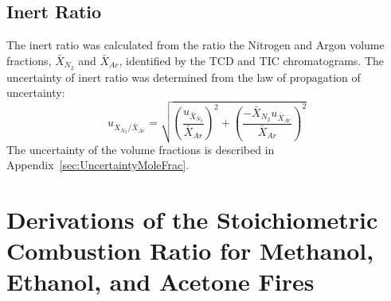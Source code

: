\documentclass[12pt]{article}
\begin{document}
\subsection{Inert Ratio}
\label{ssec:Inert_ratio}
The inert ratio was calculated from the ratio the Nitrogen and Argon volume fractions, $\bar{X}_{N_2}$ and $\bar{X}_{Ar}$, identified by the TCD and TIC chromatograms. The uncertainty of inert ratio was determined from the law of propagation of uncertainty:
\begin{equation}
\label{eq:inert_ratio_uncertainty}
u_{\scriptscriptstyle \bar{X}_{N_2}/\bar{X}_{Ar}} = \sqrt{{\left(\frac{u_{\scriptscriptstyle \bar{X}_{N_2}}}{\bar{X}_{Ar}}\right)}^2+{\left(\frac{-\bar{X}_{N_2}u_{\scriptscriptstyle \bar{X}_{Ar}}}{\bar{X}_{Ar}}\right)}^2}
\end{equation}
The uncertainty of the volume fractions is described in Appendix~\ref{sec:UncertaintyMoleFrac}.

\pagebreak

\section{Derivations of the Stoichiometric Combustion Ratio for Methanol, Ethanol, and Acetone Fires}\label{sec:SCR_Derv}
\end{document}
